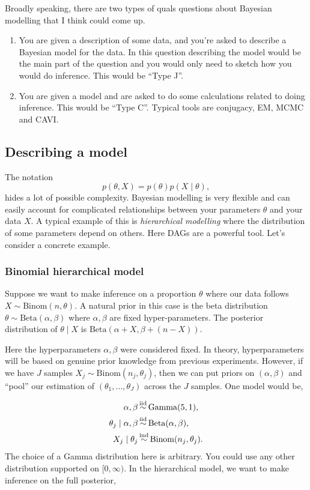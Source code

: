 Broadly speaking, there are two types of quals questions about Bayesian modelling that I think could come up. 
\begin{enumerate}
    \item You are given a description of some data, and you're asked to describe a Bayesian model for the data. In this question describing the model would be the main part of the question and you would only need to sketch how you would do inference. This would be ``Type J''.
    \item You are given a model and are asked to do some calculations related to doing inference. This would be ``Type C''. Typical tools are conjugacy, EM, MCMC and CAVI.
\end{enumerate}

\subsection{Describing a model}

The notation 
\[p(\theta,X) = p(\theta)p(X \mid \theta), \]
hides a lot of possible complexity. Bayesian modelling is very flexible and can easily account for complicated relationships between your parameters $\theta$ and your data $X$. A typical example of this is \emph{hierarchical modelling} where the distribution of some parameters depend on others. Here DAGs are a powerful tool. Let's consider a concrete example.

\subsubsection*{Binomial hierarchical model}

Suppose we want to make inference on a proportion $\theta$ where our data follows $X \sim \mathrm{Binom}(n,\theta)$. A natural prior in this case is the beta distribution $\theta \sim \mathrm{Beta}(\alpha,\beta)$ where $\alpha,\beta$ are fixed hyper-parameters. The posterior distribution of $\theta \mid X$ is $\mathrm{Beta}(\alpha + X,\beta + (n-X))$. 

Here the hyperparameters $\alpha,\beta$ were considered fixed. In theory, hyperparameters will be based on genuine prior knowledge from previous experiments. However, if we have $J$ samples $X_j \sim \mathrm{Binom}(n_j,\theta_j)$, then we can put priors on $(\alpha,\beta)$ and ``pool'' our estimation of $(\theta_1,\ldots,\theta_J)$ across the $J$ samples. One model would be,

\begin{align*}
    \alpha, \beta &\simiid \mathrm{Gamma}(5,1),\\
    \theta_j\mid \alpha,\beta &\simiid \mathrm{Beta}(\alpha,\beta),\\
    X_j \mid \theta_j & \simind \mathrm{Binom}(n_j,\theta_j). 
\end{align*}
The choice of a Gamma distribution here is arbitrary. You could use any other distribution supported on $[0,\infty)$. In the hierarchical model, we want to make inference on the full posterior,

